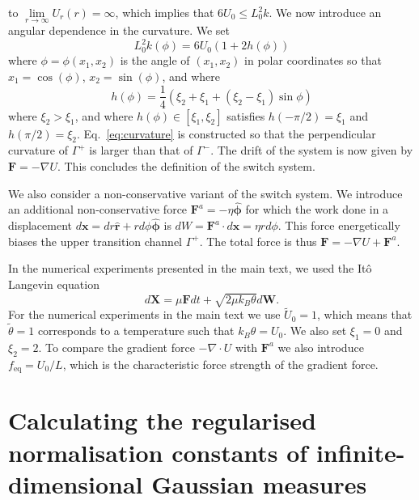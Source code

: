 \documentclass[]{cam-thesis}
\begin{document}
to $\underset{r\to\infty}{\lim}U_{r}(r)=\infty$, which implies that
$6U_{0}\leq L_0^{2}k$. We now introduce an angular dependence in the
curvature. We set
\begin{equation}
L_0^{2}k(\phi)=6U_{0}(1+2h(\phi))\label{eq:curvature}
\end{equation}
where $\phi=\phi(x_{1},x_{2})$ is the angle of $(x_{1},x_{2})$ in
polar coordinates so that $x_{1}=\cos(\phi)$, $x_{2}=\sin(\phi)$,
and where
\begin{equation}
h(\phi)=\frac{1}{4}\left(\xi_{2}+\xi_{1}+(\xi_{2}-\xi_{1})\sin\phi\right)
\end{equation}
where $\xi_{2}>\xi_{1}$, and where $h(\phi)\in[\xi_{1},\xi_{2}]$
satisfies $h(-\pi/2)=\xi_{1}$ and $h(\pi/2)=\xi_{2}$. Eq.~\eqref{eq:curvature}
is constructed so that the perpendicular curvature of $\Gamma^{+}$
is larger than that of $\Gamma^{-}$. The drift of the system is now
given by $\mathbf{F}=-\nabla U$. This concludes the definition of the switch system.

We also consider a non-conservative variant of the switch system. We introduce an additional non-conservative
force $\mathbf{F}^{a}=-\eta\hat{\boldsymbol{\phi}}$ for which the
work done in a displacement $d\mathbf{x}=dr\hat{\mathbf{r}}+rd\phi\hat{\boldsymbol{\phi}}$
is $dW=\mathbf{F}^{a}\cdot d\mathbf{x}=\eta rd\phi$. This force energetically
biases the upper transition channel $\Gamma^{+}$. The total force
is thus $\mathbf{F}=-\nabla U+\mathbf{F}^{a}$.

In the numerical experiments presented in the main text, we used the
Itô Langevin equation 
\begin{equation}
d\mathbf{X}=\mu\mathbf{F}dt+\sqrt{2\mu k_{B}\theta}d\mathbf{W}.\label{eq:langevin equation}
\end{equation}
For the numerical experiments in the main text  we use $\tilde{U}_{0}=1$,
which means that $\tilde{\theta}=1$ corresponds to a temperature
such that $k_{B}\theta=U_{0}$. We also set $\xi_{1}=0$ and $\xi_{2}=2$.
To compare the gradient force $-\nabla \cdot U$ with $\mathbf{F}^{a}$ we also introduce
$f_{\text{eq}}=U_{0}/L$, which is the characteristic force strength
of the gradient force.

\chapter{Calculating the regularised normalisation constants of infinite-dimensional Gaussian measures} \label{app:Calculation of the Gaussian normalisation constants}
\end{document}
